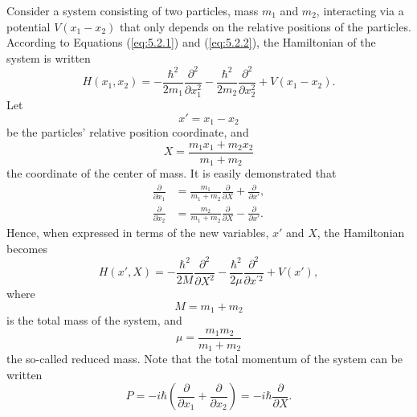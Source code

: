 Consider a system consisting of two particles, mass $m_{1}$ and $m_{2}$, interacting via a potential $V(x_{1}-x_{2})$ that only depends on the relative positions of the particles. According to Equations (\ref{eq:5.2.1}) and (\ref{eq:5.2.2}), the Hamiltonian of the system is written
\begin{equation}
	H(x_{1}, x_{2}) = -\frac{\hbar^{2}}{2 m_{1}}\frac{\partial^{2}}{\partial x_{1}^{2}} - \frac{\hbar^{2}}{2 m_{2}}\frac{\partial^{2}}{\partial x_{2}^{2}} + V(x_{1}-x_{2}).
	\label{eq:5.3.1}
\end{equation}
Let
\begin{equation}
	x' = x_{1} - x_{2}
	\label{eq:5.3.2}
\end{equation}
be the particles' relative position coordinate, and
\begin{equation}
	X = \frac{m_1 x_1 + m_2 x_2}{m_1 + m_2}
	\label{eq:5.3.3}
\end{equation}
the coordinate of the center of mass. It is easily demonstrated that
\begin{align}
	\frac{\partial}{\partial x_1} &= \frac{m_1}{m_1+m_2}\frac{\partial}{\partial X} + \frac{\partial}{\partial x'}, \label{eq:5.3.4a} \\
	\frac{\partial}{\partial x_2} &= \frac{m_2}{m_1+m_2}\frac{\partial}{\partial X} - \frac{\partial}{\partial x'}. \label{eq:5.3.4b}
\end{align}
Hence, when expressed in terms of the new variables, $x'$ and $X$, the Hamiltonian becomes
\begin{equation}
	H(x', X) = -\frac{\hbar^{2}}{2 M}\frac{\partial^{2}}{\partial X^{2}} - \frac{\hbar^{2}}{2\mu}\frac{\partial^{2}}{\partial x^{\prime 2}} + V(x'),
	\label{eq:5.3.5}
\end{equation}
where
\begin{equation}
	M = m_{1} + m_{2}
	\label{eq:5.3.6}
\end{equation}
is the total mass of the system, and
\begin{equation}
	\mu = \frac{m_{1} m_{2}}{m_{1} + m_{2}}
	\label{eq:5.3.7}
\end{equation}
the so-called reduced mass. Note that the total momentum of the system can be written
\begin{equation}
	P = -i\hbar\left(\frac{\partial}{\partial x_1} + \frac{\partial}{\partial x_2}\right) = -i\hbar\frac{\partial}{\partial X}.
	\label{eq:5.3.8}
\end{equation}

